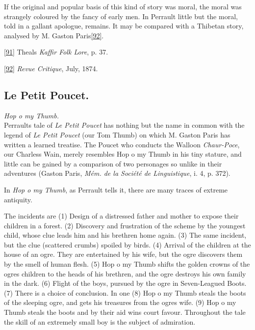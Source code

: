 \documentclass[14pt,a4paper]{memoir}
\begin{document}
If the original and popular basis of this kind of story was moral, the
moral was strangely coloured by the fancy of early men. In Perrault
little but the moral, told in a gallant apologue, remains. It may be
compared with a Thibetan story, analysed by M. Gaston
Paris\protect\hypertarget{4533318093929944247_33931-h-1.htm.xhtmlux5cux23FNanchor_92}{}{}\protect\hyperlink{4533318093929944247_33931-h-1.htm.xhtmlux5cux23Footnote_92}{{[}92{]}}.

\protect\hypertarget{4533318093929944247_33931-h-1.htm.xhtmlux5cux23Footnote_91}{}{}\protect\hyperlink{4533318093929944247_33931-h-1.htm.xhtmlux5cux23FNanchor_91}{{{[}91{]}}}
Theal\textquotesingle s \emph{Kaffir Folk Lore}, p. 37.

\protect\hypertarget{4533318093929944247_33931-h-1.htm.xhtmlux5cux23Footnote_92}{}{}\protect\hyperlink{4533318093929944247_33931-h-1.htm.xhtmlux5cux23FNanchor_92}{{{[}92{]}}}
\emph{Revue Critique}, July, 1874.

\subsection{Le Petit Poucet.}

\emph{Hop o\textquotesingle{} my Thumb.} \\

Perrault\textquotesingle s tale of \emph{Le Petit Poucet} has nothing
but the name in common with the legend of \emph{Le Petit Poucet} (our
\textquotesingle Tom Thumb\textquotesingle) on which M. Gaston Paris has
written a learned treatise. The Poucet who conducts the Walloon
\emph{Chaur-Poce}, our \textquotesingle Charles\textquotesingle s
Wain,\textquotesingle{} merely resembles Hop o\textquotesingle{} my
Thumb in his tiny stature, and little can be gained by a comparison of
two personages so unlike in their adventures (Gaston Paris, \emph{Mém.
de la Société de Linguistique}, i. 4, p. 372).

In \emph{Hop o\textquotesingle{} my Thumb}, as Perrault tells it, there
are many traces of extreme antiquity.

The incidents are (1) Design of a distressed father and mother to expose
their children in a forest. (2) Discovery and frustration of the scheme
by the youngest child, whose clue leads him and his brethren home again.
(3) The same incident, but the clue (scattered crumbs) spoiled by birds.
(4) Arrival of the children at the house of an ogre. They are
entertained by his wife, but the ogre discovers them by the smell of
human flesh. (5) Hop o\textquotesingle{} my Thumb shifts the golden
crowns of the ogre\textquotesingle s children to the heads of his
brethren, and the ogre destroys his own family in the dark. (6) Flight
of the boys, pursued by the ogre in Seven-Leagued Boots. (7) There is a
choice of conclusion. In one (8) Hop o\textquotesingle{} my Thumb steals
the boots of the sleeping ogre, and gets his treasures from the
ogre\textquotesingle s wife. (9) Hop o\textquotesingle{} my Thumb steals
the boots and by their aid wins court favour. Throughout the tale the
skill of an extremely small boy is the subject of admiration.
\end{document}
